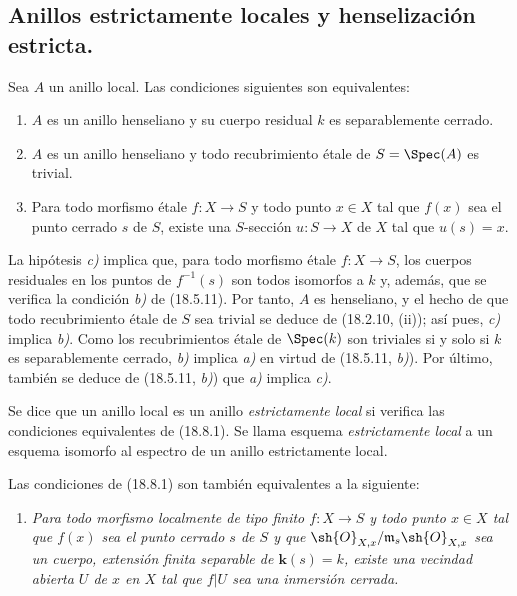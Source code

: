 \subsection{Anillos estrictamente locales y henselización estricta.}
\label{subsection:IV.18.8}

\begin{proposition}[18.8.1]
\label{IV.18.8.1}
Sea $A$ un anillo local. Las condiciones siguientes son equivalentes:
\begin{enumerate}
  \item[\textup{a)}] $A$ es un anillo henseliano y su cuerpo residual $k$ es separablemente cerrado.
  \item[\textup{b)}] $A$ es un anillo henseliano y todo recubrimiento étale de $S=\Spec(A)$ es trivial.
  \item[\textup{c)}] Para todo morfismo étale $f:X\to S$ y todo punto $x\in X$ tal que $f(x)$ sea el punto cerrado $s$ de $S$, existe una $S$-sección $u:S\to X$ de $X$ tal que $u(s)=x$.
\end{enumerate}
\end{proposition}

La hipótesis \emph{c)} implica que, para todo morfismo étale $f:X\to S$, los cuerpos residuales en los puntos de $f^{-1}(s)$ son todos isomorfos a $k$ y, además, que se verifica la condición \emph{b)} de (18.5.11).
Por tanto, $A$ es henseliano, y el hecho de que todo recubrimiento étale de $S$ sea trivial se deduce de (18.2.10, (ii)); así pues, \emph{c)} implica \emph{b)}. Como los recubrimientos étale de $\Spec(k)$ son triviales si y solo si $k$ es separablemente cerrado, \emph{b)} implica \emph{a)} en virtud de (18.5.11, \emph{b)}). Por último, también se deduce de (18.5.11, \emph{b)}) que \emph{a)} implica \emph{c)}.

\begin{definition}[18.8.2]
\label{IV.18.8.2}
Se dice que un anillo local es un anillo \emph{estrictamente local} si verifica las condiciones equivalentes de \textup{(18.8.1)}. Se llama esquema \emph{estrictamente local} a un esquema isomorfo al espectro de un anillo estrictamente local.
\end{definition}

\begin{remark}[18.8.3]
\label{IV.18.8.3}
Las condiciones de (18.8.1) son también equivalentes a la siguiente:
\begin{enumerate}
  \item[\textup{d)}] \itshape Para todo morfismo localmente de tipo finito $f:X\to S$ y todo punto $x\in X$ tal que $f(x)$ sea el punto cerrado $s$ de $S$ y que $\sh{O}_{X,x}/\mathfrak m_s\sh{O}_{X,x}$ sea un cuerpo, extensión finita separable de $\boldsymbol{k}(s)=k$, existe una vecindad abierta $U$ de $x$ en $X$ tal que $f|U$ sea una inmersión cerrada.
\end{enumerate}
\end{remark}

